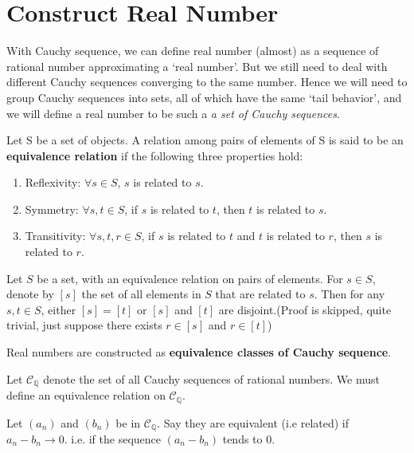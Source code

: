 \section{Construct Real Number}
With Cauchy sequence, we can define real number (almost) as a sequence of rational number approximating a `real number'. But we still need to deal with different Cauchy sequences converging to the same number. Hence we will need to group Cauchy sequences into sets, all of which have the same `tail behavior', and we will define a real number to be such a \emph{a set of Cauchy sequences}.
\begin{myDef}
	Let S be a set of objects. A relation among pairs of elements of S is said to be an \textbf{equivalence relation} if the following three properties hold:
	\begin{enumerate}
		\item Reflexivity: $\forall s\in S$, $s$ is related to $s$.
		\item Symmetry: $\forall s, t \in S$, if $s$ is related to $t$, then $t$ is related to $s$.
		\item Transitivity: $\forall s,t,r \in S$, if $s$ is related to $t$ and $t$ is related to $r$, then $s$ is related to $r$.
	\end{enumerate}
\end{myDef}
\begin{myTheo}
	Let $S$ be a set, with an equivalence relation on pairs of elements. For $s\in S$, denote by $[s]$ the set of all elements in $S$ that are related to $s$. Then for any $s,t\in S$, either $[s]=[t]$ or $[s]$ and $[t]$ are disjoint.(Proof is skipped, quite trivial, just suppose there exists $r\in [s]$ and $r\in [t]$)
\end{myTheo}
\begin{myDef}
	Real numbers are constructed as \textbf{equivalence classes of Cauchy sequence}.
\end{myDef}
Let $\mathscr{C}_\mathbb{Q}$ denote the set of all Cauchy sequences of rational numbers. We must define an equivalence relation on $\mathscr{C}_\mathbb{Q}$.
\begin{myDef}
	Let $(a_n)$ and $(b_n)$ be in $\mathscr{C}_\mathbb{Q}$. Say they are equivalent (i.e related) if $a_n-b_n\rightarrow 0$. i.e. if the sequence $(a_n-b_n)$ tends to $0$.
\end{myDef}